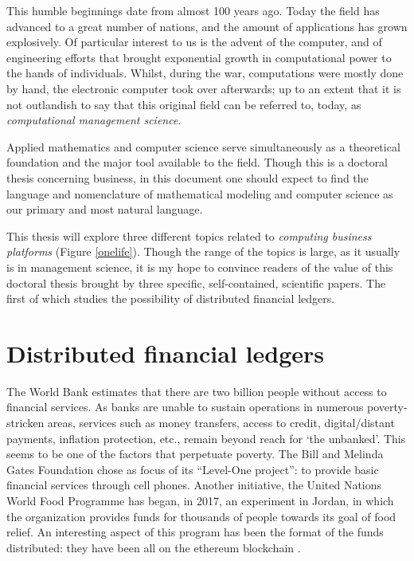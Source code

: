 This humble beginnings date from almost 100 years ago. Today the field has advanced to a great number of nations, and the amount of applications has grown explosively.  Of particular interest to us is the advent of the computer, and of engineering efforts that brought exponential growth in computational power to the hands of individuals.  Whilst, during the war, computations were mostly done by hand, the electronic computer took over afterwards; up to an extent that it is not outlandish to say that this original field can be referred to, today, as \emph{computational management science}.

Applied mathematics and computer science serve simultaneously as a theoretical foundation and the major tool available to the field.  Though this is a doctoral thesis concerning business, in this document one should expect to find the language and nomenclature of mathematical modeling and computer science as our primary and most natural language.

This thesis will explore three different topics related to \emph{computing business platforms} (Figure \ref{onelife}). Though the range of the topics is large, as it usually is in management science, it is my hope to convince readers of the value of this doctoral thesis brought by three specific, self-contained, scientific papers.  The first of which studies the possibility of distributed financial ledgers.

\section{Distributed financial ledgers}

The World Bank estimates that there are two billion people without access to financial services. As banks are unable to sustain operations in numerous poverty-stricken areas, services such as money transfers, access to credit, digital/distant payments, inflation protection, etc., remain beyond reach for `the unbanked'.  This seems to be one of the factors that perpetuate poverty.  The Bill and Melinda Gates Foundation chose as focus of its ``Level-One project'': to provide basic financial services through cell phones. Another initiative, the United Nations World Food Programme has began, in 2017, an experiment in Jordan, in which the organization provides funds for thousands of people towards its goal of food relief.  An interesting aspect of this program has been the format of the funds distributed:  they have been all on the ethereum blockchain \citep{woyke2017blockchain, UN-you-pay-we-take-the-photo, UNFOODPROG}.

